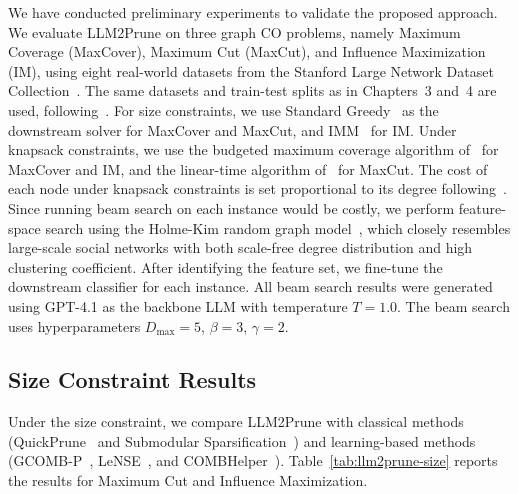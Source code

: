 We have conducted preliminary experiments to validate the proposed approach. We evaluate
LLM2Prune on three graph CO problems, namely Maximum Coverage (MaxCover), Maximum Cut
(MaxCut), and Influence Maximization (IM), using
eight real-world datasets from the Stanford Large Network Dataset
Collection~\citep{leskovec2016snap}. The same datasets and train-test splits as in
Chapters~3 and~4 are used, following~\citep{ireland2022lense}. For size constraints, we use Standard Greedy~\citep{nemhauser1978analysis} as the
downstream solver for MaxCover and MaxCut, and IMM~\citep{tang2015influence} for IM.
Under knapsack constraints, we use the budgeted maximum coverage
algorithm of~\citet{khuller1999budgeted} for MaxCover and IM, and the linear-time
algorithm of~\citet{pham2023linear} for MaxCut. The cost of each node under knapsack constraints is set proportional to its degree
following~\citep{pmlr-v258-nath25a, yaroslavtsev2020bring}. Since running beam search on
each instance would be costly, we perform feature-space search using the Holme-Kim random
graph model~\citep{holme2002growing}, which closely resembles large-scale social networks
with both scale-free degree distribution and high clustering coefficient. After identifying
the feature set, we fine-tune the downstream classifier for each instance.
All beam search results were generated using GPT-4.1 as the backbone LLM with temperature
$T = 1.0$. The beam search uses hyperparameters $D_{\max} = 5$, $\beta = 3$, $\gamma = 2$.

\subsection{Size Constraint Results}

Under the size constraint, we compare LLM2Prune with classical methods
(QuickPrune~\citep{pmlr-v258-nath25a} and Submodular
Sparsification~\citep{zhou2017scaling}) and learning-based methods
(GCOMB-P~\citep{manchanda2020gcomb}, LeNSE~\citep{ireland2022lense}, and
COMBHelper~\citep{tian2024combhelper}). Table~\ref{tab:llm2prune-size} reports the results
for Maximum Cut and Influence Maximization.

